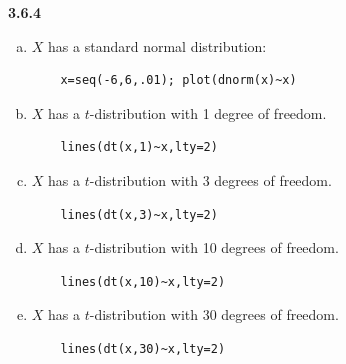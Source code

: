 \documentclass{book}
\theoremstyle{definition}
\begin{document}
\noindent \textbf{3.6.4}
\begin{enumerate}[(a)]
	\item $X$ has a standard normal distribution:
	\begin{lstlisting}
	x=seq(-6,6,.01); plot(dnorm(x)~x)
	\end{lstlisting}
	\item $X$ has a $t$-distribution with 1 degree of freedom.
	\begin{lstlisting}
	lines(dt(x,1)~x,lty=2)
	\end{lstlisting}
	\item $X$ has a $t$-distribution with 3 degrees of freedom.
	\begin{lstlisting}
	lines(dt(x,3)~x,lty=2)
	\end{lstlisting}
	\item $X$ has a $t$-distribution with 10 degrees of freedom.
	\begin{lstlisting}
	lines(dt(x,10)~x,lty=2)
	\end{lstlisting}
	\item $X$ has a $t$-distribution with 30 degrees of freedom.
	\begin{lstlisting}
	lines(dt(x,30)~x,lty=2)
	\end{lstlisting}
\end{enumerate}
\end{document}
